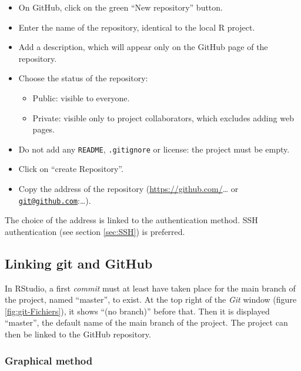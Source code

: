 \documentclass[
  12pt,
  american,
  a4paper,
  extrafontsizes,onecolumn,openright
  ]{memoir}
\providecommand{\tightlist}{%
  \setlength{\itemsep}{0pt}\setlength{\parskip}{0pt}}
\begin{document}
\begin{itemize}
\tightlist
\item
  On GitHub, click on the green \enquote{New repository} button.
\item
  Enter the name of the repository, identical to the local R project.
\item
  Add a description, which will appear only on the GitHub page of the repository.
\item
  Choose the status of the repository:

  \begin{itemize}
  \tightlist
  \item
    Public: visible to everyone.
  \item
    Private: visible only to project collaborators, which excludes adding web pages.
  \end{itemize}
\item
  Do not add any \texttt{README}, \texttt{.gitignore} or license: the project must be empty.
\item
  Click on \enquote{create Repository}.
\item
  Copy the address of the repository (\url{https://github.com/}\ldots{} or \href{mailto:git@github.com}{\nolinkurl{git@github.com}}:\ldots).
\end{itemize}

The choice of the address is linked to the authentication method.
SSH authentication (see section \ref{sec:SSH}) is preferred.

\hypertarget{linking-git-and-github}{%
\subsection{Linking git and GitHub}\label{linking-git-and-github}}

In RStudio, a first \emph{commit} must at least have taken place for the main branch of the project, named \enquote{master}, to exist.
At the top right of the \emph{Git} window (figure \ref{fig:git-Fichiers}), it shows \enquote{(no branch)} before that.
Then it is displayed \enquote{master}, the default name of the main branch of the project.
The project can then be linked to the GitHub repository.

\hypertarget{graphical-method}{%
\subsubsection{Graphical method}\label{graphical-method}}
\end{document}
